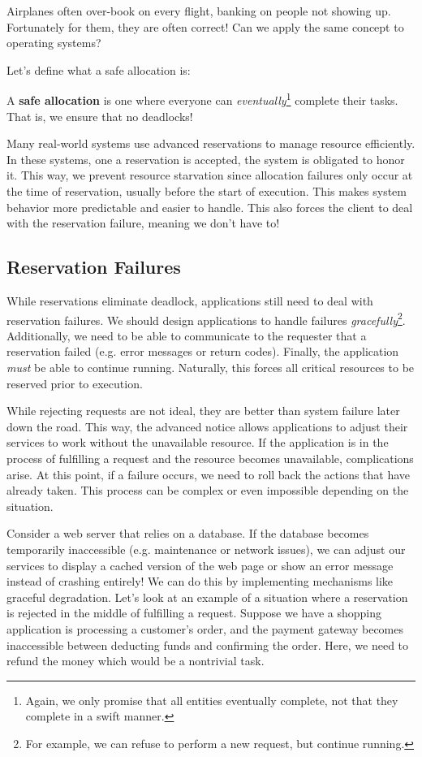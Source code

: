 \documentclass{report}
\newcommand{\definitionBegin}[1]{\begin{tcolorbox}[title={Definition: #1}]}
\newcommand{\definitionEnd}{\end{tcolorbox}}
\newcommand{\exampleBegin}[1]{\begin{tcolorbox}[colback=blue!5!white,colframe=black!75!blue,title={Example:
      #1}]}
\newcommand{\exampleEnd}{\end{tcolorbox}}
\newcommand{\corollaryBegin}[1]{\begin{tcolorbox}[colback=teal!5!white,colframe=black!75!teal,title={Corollary:
      #1}]}
\newcommand{\corollaryEnd}{\end{tcolorbox}}
\begin{document}
\exampleBegin{Fly Fucked}
Airplanes often over-book on every flight, banking on people not showing up. Fortunately for them,
they are often correct! Can we apply the same concept to operating systems?
\exampleEnd

Let's define what a safe allocation is:

\definitionBegin{Safe Allocation}
A \textbf{safe allocation} is one where everyone can \textit{eventually}\footnote{Again, we only
  promise that all entities eventually complete, not that they complete in a swift manner.} complete
their tasks. That is, we ensure that no deadlocks!
\definitionEnd

\corollaryBegin{Commodity Resource Management in Real Systems}
Many real-world systems use advanced reservations to manage resource efficiently. In these systems,
one a reservation is accepted, the system is obligated to honor it. This way, we prevent resource
starvation since allocation failures only occur at the time of reservation, usually before the start
of execution. This makes system behavior more predictable and easier to handle. This also forces the
client to deal with the reservation failure, meaning we don't have to!
\corollaryEnd


\subsection{Reservation Failures}
While reservations eliminate deadlock, applications still need to deal with reservation failures. We
should design applications to handle failures \textit{gracefully}\footnote{For example, we can
  refuse to perform a new request, but continue running.}. Additionally, we need to be able to
communicate to the requester that a reservation failed (e.g. error messages or return
codes). Finally, the application \textit{must} be able to continue running. Naturally, this forces
all critical resources to be reserved prior to execution.

While rejecting requests are not ideal, they are better than system failure later down the
road. This way, the advanced notice allows applications to adjust their services to work without the
unavailable resource. If the application is in the process of fulfilling a request and the resource
becomes unavailable, complications arise. At this point, if a failure occurs, we need to roll back
the actions that have already taken. This process can be complex or even impossible depending on the
situation.

\exampleBegin{Reservation Rejected!}
Consider a web server that relies on a database. If the database becomes temporarily inaccessible
(e.g. maintenance or network issues), we can adjust our services to display a cached version of the
web page or show an error message instead of crashing entirely! We can do this by implementing
mechanisms like graceful degradation. Let's look at an example of a situation where a reservation is
rejected in the middle of fulfilling a request. Suppose we have a shopping application is processing
a customer's order, and the payment gateway becomes inaccessible between deducting funds and
confirming the order. Here, we need to refund the money which would be a nontrivial task.
\exampleEnd
\end{document}
